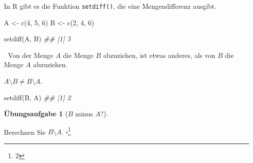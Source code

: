 \documentclass[
  ngerman,
  letterpaper,
  twoside,
  open=any]{scrbook}
\newenvironment{Shaded}{\begin{snugshade}}{\end{snugshade}}
\newcommand{\DecValTok}[1]{\textcolor[rgb]{0.68,0.00,0.00}{#1}}
\newcommand{\DocumentationTok}[1]{\textcolor[rgb]{0.37,0.37,0.37}{\textit{#1}}}
\newcommand{\FunctionTok}[1]{\textcolor[rgb]{0.28,0.35,0.67}{#1}}
\newcommand{\NormalTok}[1]{\textcolor[rgb]{0.00,0.23,0.31}{#1}}
\newcommand{\OtherTok}[1]{\textcolor[rgb]{0.00,0.23,0.31}{#1}}
\theoremstyle{definition}
\theoremstyle{plain}
\theoremstyle{definition}
\newtheorem{exercise}{Übungsaufgabe}[chapter]
\theoremstyle{definition}
\theoremstyle{definition}
\theoremstyle{definition}
\newtheorem{exercise}{Übungsaufgabe}[chapter]
\theoremstyle{remark}
\begin{document}
In R gibt es die Funktion \texttt{setdiff()}, die eine Mengendifferenz
ausgibt.

\begin{Shaded}
\begin{Highlighting}[]
\NormalTok{A }\OtherTok{\textless{}{-}} \FunctionTok{c}\NormalTok{(}\DecValTok{4}\NormalTok{, }\DecValTok{5}\NormalTok{, }\DecValTok{6}\NormalTok{)}
\NormalTok{B }\OtherTok{\textless{}{-}} \FunctionTok{c}\NormalTok{(}\DecValTok{2}\NormalTok{, }\DecValTok{4}\NormalTok{, }\DecValTok{6}\NormalTok{)}

\FunctionTok{setdiff}\NormalTok{(A, B)}
\DocumentationTok{\#\# [1] 5}
\end{Highlighting}
\end{Shaded}

🤯 Von der Menge \(A\) die Menge \(B\) abzuziehen, ist etwas anderes,
als von \(B\) die Menge \(A\) abzuziehen.

\begin{tcolorbox}[enhanced jigsaw, arc=.35mm, bottomrule=.15mm, bottomtitle=1mm, breakable, colback=white, colbacktitle=quarto-callout-caution-color!10!white, colframe=quarto-callout-caution-color-frame, coltitle=black, left=2mm, leftrule=.75mm, opacityback=0, opacitybacktitle=0.6, rightrule=.15mm, title=\textcolor{quarto-callout-caution-color}{\faFire}\hspace{0.5em}{Vorsicht}, titlerule=0mm, toprule=.15mm, toptitle=1mm]

\(A \setminus B \ne B \setminus A\).

\end{tcolorbox}

\begin{Shaded}
\begin{Highlighting}[]
\FunctionTok{setdiff}\NormalTok{(B, A)}
\DocumentationTok{\#\# [1] 2}
\end{Highlighting}
\end{Shaded}

\begin{exercise}[\(B\) minus
\(A\)?]\protect\hypertarget{exr-setminus2}{}\label{exr-setminus2}

Berechnen Sie \(B \setminus A\). \(\square\)\footnote{2}

\end{exercise}
\end{document}
